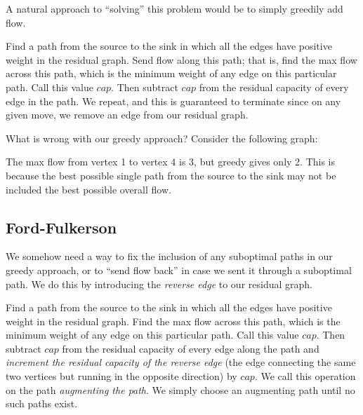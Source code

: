 A natural approach to ``solving'' this problem would be to simply greedily add flow.

Find a path from the source to the sink in which all the edges have positive weight in the residual graph. Send flow along this path; that is, find the max flow across this path, which is the minimum weight of any edge on this particular path. Call this value $cap$. Then subtract $cap$ from the residual capacity of every edge in the path. We repeat, and this is guaranteed to terminate since on any given move, we remove an edge from our residual graph.

What is wrong with our greedy approach? Consider the following graph:

\begin{center}
\end{center}

The max flow from vertex 1 to vertex 4 is 3, but greedy gives only 2. This is because the best possible single path from the source to the sink may not be included the best possible overall flow.

\subsection{Ford-Fulkerson}

We somehow need a way to fix the inclusion of any suboptimal paths in our greedy approach, or to ``send flow back'' in case we sent it through a suboptimal path. We do this by introducing the \textit{reverse edge} to our residual graph.

Find a path from the source to the sink in which all the edges have positive weight in the residual graph. Find the max flow across this path, which is the minimum weight of any edge on this particular path. Call this value $cap$. Then subtract $cap$ from the residual capacity of every edge along the path and \textit{increment the residual capacity of the reverse edge} (the edge connecting the same two vertices but running in the opposite direction) by $cap$. We call this operation on the path \textit{augmenting the path}. We simply choose an augmenting path until no such paths exist.

